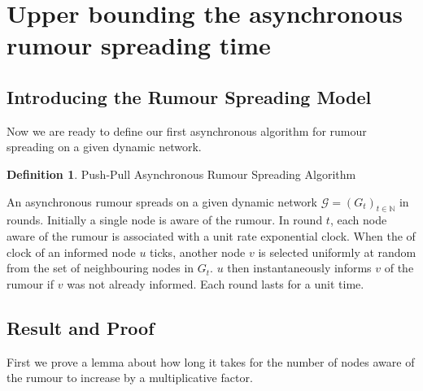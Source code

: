 \documentclass[a4paper,11pt]{article}
\theoremstyle{definition}
\newtheorem{definition}[theorem]{Definition}
\begin{document}
\section{Upper bounding the asynchronous rumour spreading time}
\label{AsyncUpperBoundSection}

\subsection{Introducing the Rumour Spreading Model}
Now we are ready to define our first asynchronous algorithm for rumour spreading on a given dynamic network.

\begin{definition}
	Push-Pull Asynchronous Rumour Spreading Algorithm 
\end{definition}
\label{NodeCentricAsyncAlgorithm}

\noindent
An asynchronous rumour spreads on a given dynamic network $\mathcal{G} = (G_t)_{t\in \mathbb{N}}$ in rounds. Initially a single node is aware of the rumour. In round $t$, each node aware of the rumour is associated with a unit rate exponential clock. When the of clock of an informed node $u$ ticks, another node $v$ is selected uniformly at random from the set of neighbouring nodes in $G_t$. $u$ then instantaneously informs $v$ of the rumour if $v$ was not already informed. Each round lasts for a unit time. %





\subsection{Result and Proof}

First we prove a lemma about how long it takes for the number of nodes aware of the rumour to increase by a multiplicative factor. 
\end{document}

